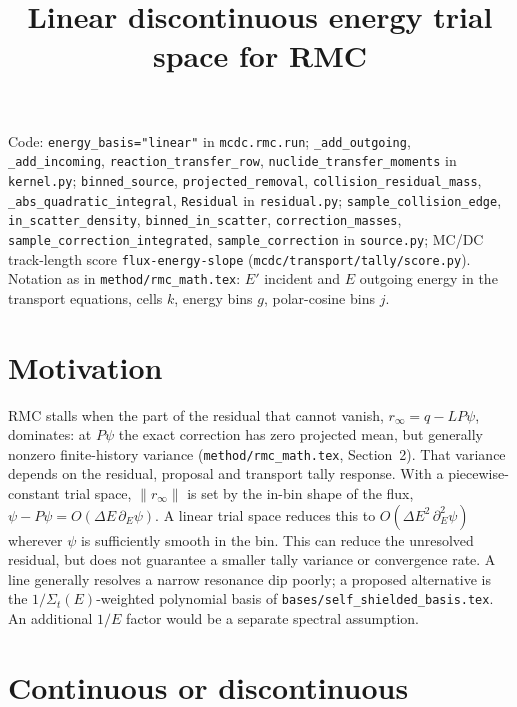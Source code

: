 \documentclass[11pt]{article}
\title{Linear discontinuous energy trial space for RMC}
\date{}
\newcommand{\Sigt}{\Sigma_t}
\begin{document}
\maketitle

\noindent Code: \texttt{energy\_basis="linear"} in \texttt{mcdc.rmc.run};
\texttt{\_add\_outgoing}, \texttt{\_add\_incoming}, \texttt{reaction\_transfer\_row},
\texttt{nuclide\_transfer\_moments} in \texttt{kernel.py};
\texttt{binned\_source}, \texttt{projected\_removal}, \texttt{collision\_residual\_mass},
\texttt{\_abs\_quadratic\_integral}, \texttt{Residual} in \texttt{residual.py};
\texttt{sample\_collision\_edge}, \texttt{in\_scatter\_density},
\texttt{binned\_in\_scatter}, \texttt{correction\_masses},
\texttt{sample\_correction\_integrated}, \texttt{sample\_correction} in
\texttt{source.py}; MC/DC track-length score \texttt{flux-energy-slope}
(\texttt{mcdc/transport/tally/score.py}). Notation as in \texttt{method/rmc\_math.tex}:
$E'$ incident and $E$ outgoing energy in the transport equations, cells $k$, energy
bins $g$, polar-cosine bins $j$.

\section{Motivation}

RMC stalls when the part of the residual that cannot vanish, $r_\infty = q - L P\psi$,
dominates: at $P\psi$ the exact correction has zero projected mean, but generally
nonzero finite-history variance (\texttt{method/rmc\_math.tex}, Section~2). That variance
depends on the residual, proposal and transport tally response. With a
piecewise-constant trial space, $\|r_\infty\|$ is set by the in-bin shape of the flux,
$\psi - P\psi = O(\Delta E\,\partial_E\psi)$. A linear trial space reduces this to
$O(\Delta E^2\,\partial_E^2\psi)$ wherever $\psi$ is sufficiently smooth in the bin.
This can reduce the unresolved residual, but does not guarantee a smaller tally
variance or convergence rate. A line generally resolves a narrow resonance dip
poorly; a proposed alternative is the $1/\Sigt(E)$-weighted polynomial basis of
\texttt{bases/self\_shielded\_basis.tex}. An additional $1/E$ factor would be a separate
spectral assumption.

\section{Continuous or discontinuous}
\end{document}
